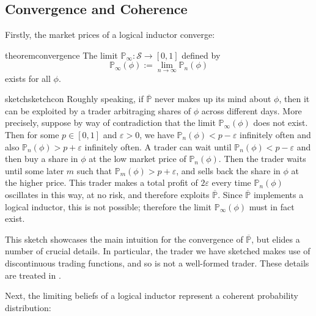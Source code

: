 \documentclass[authordate,onecolumn,noenvironments]{miri-tech-article}
\numberwithin{equation}{subsection}
\newcommand{\seq}[1]{{\overline{#1}}}
\newcommand{\nn}{n}
\newcommand{\li}{logical inductor}
\newcommand{\BelState}{\mathbb{P}}
\newcommand{\pt}{\BelState}
\newcommand{\MP}{\seq{\pt}}
\newcommand{\Sentences}{\mathcal{S}}
\begin{document}
\subsection{Convergence and Coherence}\label{sec:limitprops}

Firstly, the market prices of a \li{} converge:

\begin{restatable}[Convergence]{theorem}{convergence}\label{thm:con}\label{thm:first}
  The limit ${\pt_\infty:\Sentences\rightarrow[0,1]}$ defined by \[\pt_\infty(\phi) := \lim_{\nn\rightarrow\infty} \pt_\nn(\phi)\] exists for all $\phi$.
\end{restatable}
\begin{restatable}{sketch}{sketchcon}
  Roughly speaking, if $\MP$ never makes up its mind about $\phi$, then it can be exploited by a trader arbitraging shares of $\phi$ across different days. More precisely, suppose by way of contradiction that the limit $\pt_\infty(\phi)$ does not exist. Then for some $p\in [0, 1]$ and $\varepsilon > 0$, we have $\pt_\nn(\phi) < p-\varepsilon$ infinitely often and also $\pt_\nn(\phi) > p+\varepsilon$  infinitely often. A trader can wait until $\pt_\nn(\phi) < p-\varepsilon$ and then buy a share in $\phi$ at the low market price of $\pt_\nn(\phi)$. Then the trader waits until some later $m$ such that $\pt_m(\phi) > p+\varepsilon$, and sells back the share in $\phi$ at the higher price. This trader makes a total profit of $2\varepsilon$ every time $\pt_\nn(\phi)$ oscillates in this way, at no risk, and therefore exploits $\MP$. Since $\MP$ implements a logical inductor, this is not possible; therefore the limit $\pt_\infty(\phi)$ must in fact exist.
\end{restatable}

\noindent This sketch showcases the main intuition for the convergence of $\MP$, but elides a number of crucial details. In particular, the trader we have sketched makes use of discontinuous trading functions, and so is not a well-formed trader. These details are treated in .

Next, the limiting beliefs of a \li{} represent a coherent probability distribution:
\end{document}
